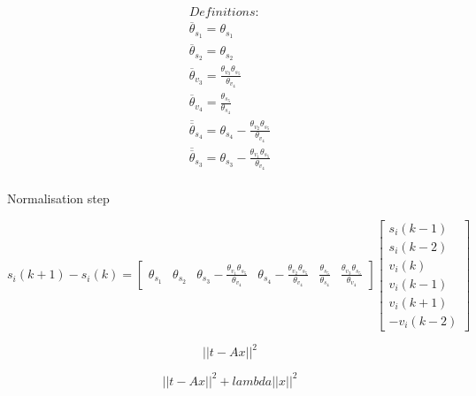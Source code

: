 \documentclass[10pt]{article}         %
\begin{document}
\begin{equation}
\begin{split}
Definitions:\\
\overline{\theta}_{s_1} = \theta_{s_1}\\ 
\overline{\theta}_{s_2} = \theta_{s_2}\\
\overline{\theta}_{v_3} = \frac {\theta_{v_3}\theta_{s_5} } {\theta_{v_4}}\\
\overline{\theta}_{v_4} = \frac{\theta_{s_5} } {\theta_{s_4}}\\
\overline{\overline{\theta}}_{s_4} =\theta_{s_4} - \frac {\theta_{v_2}\theta_{s_5} } {\theta_{v_4}}\\
\overline{\overline{\theta}}_{s_3} =\theta_{s_3}  - \frac {\theta_{v_1}\theta_{s_5} } {\theta_{v_4}}\\
\end{split}
\end{equation}











Normalisation step


\begin{equation}
s_i(k+1) - s_i(k) = \begin{bmatrix} 
    {\theta}_{s_1} & 
    {\theta}_{s_2} &
    {\theta}_{s_3} - \frac{\theta_{v_1}\theta_{s_5}}{\theta_{v_4}} &
    {\theta}_{s_4} - \frac{\theta_{v_2}\theta_{s_5}}{\theta_{v_4}} &
    \frac{\theta_{s_5} } {\theta_{s_4}} &
    \frac {\theta_{v_3}\theta_{s_5} } {\theta_{v_4}} 

    \end{bmatrix}
    \begin{bmatrix} s_i(k-1) \\ s_i(k-2) \\ v_i(k) \\ v_i(k-1) \\ v_i(k+1) \\ - v_i(k-2) \end{bmatrix}
\end{equation}

\begin{equation}
|| t - A x || ^ 2
\end{equation}

\begin{equation}
|| t - A x || ^ 2 + lambda || x || ^ 2
\end{equation}
\end{document}

